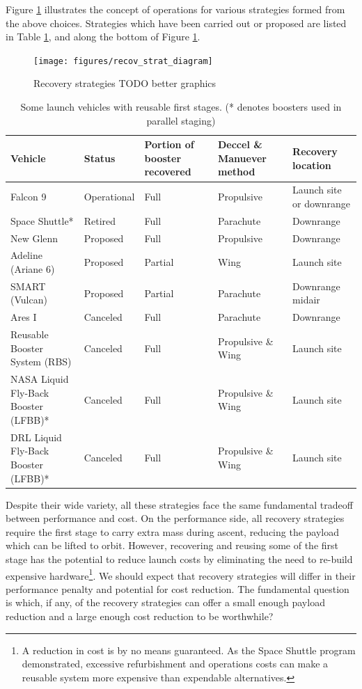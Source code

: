 \documentclass[conf]{new-aiaa}
\begin{document}
Figure \ref{fig:recov_strat_diagram} illustrates the concept of operations for various strategies formed from the above choices. Strategies which have been carried out or proposed are listed in Table \ref{tab:vehicles}, and along the bottom of Figure \ref{fig:recov_strat_diagram}.

\begin{figure}[hbt!]
	\centering
	\texttt{[image: figures/recov\_strat\_diagram]}
	\label{fig:recov_strat_diagram}
	\caption{Recovery strategies TODO better graphics}
\end{figure}

\begin{table}
	\caption{\label{tab:vehicles} Some launch vehicles with reusable first stages. (* denotes boosters used in parallel staging)}
	\centering
	\begin{tabular}{p{4cm} l p{2cm}  p{2cm} p{2cm}}
		\hline
		Vehicle & Status & Portion of booster recovered & Deccel \& Manuever method & Recovery location \\
		\hline
		\hline
		Falcon 9 & Operational & Full & Propulsive & Launch site or downrange \\
		\hline
		Space Shuttle* & Retired & Full & Parachute & Downrange \\
		\hline
		New Glenn & Proposed & Full & Propulsive & Downrange \\
		Adeline (Ariane 6) & Proposed & Partial & Wing & Launch site \\
		SMART (Vulcan) \cite{Ragab2015} & Proposed & Partial & Parachute & Downrange midair \\
		\hline
		Ares I \cite{Ares2009} & Canceled & Full & Parachute & Downrange \\
		Reusable Booster System (RBS) \cite{NAP13534} & Canceled & Full & Propulsive \& Wing & Launch site\\
		NASA Liquid Fly-Back Booster (LFBB)* \cite{Healy1998} & Canceled & Full & Propulsive \& Wing & Launch site\\
		DRL Liquid Fly-Back Booster (LFBB)* \cite{Sippel2003} & Canceled & Full & Propulsive \& Wing & Launch site\\
		\hline
	\end{tabular}
\end{table}

Despite their wide variety, all these strategies face the same fundamental tradeoff between performance and cost. On the performance side, all recovery strategies require the first stage to carry extra mass during ascent, reducing the payload which can be lifted to orbit. However, recovering and reusing some of the first stage has the potential to reduce launch costs by eliminating the need to re-build expensive hardware\footnote{A reduction in cost is by no means guaranteed. As the Space Shuttle program demonstrated, excessive refurbishment and operations costs can make a reusable system more expensive than expendable alternatives.}. We should expect that recovery strategies will differ in their performance penalty and potential for cost reduction. The fundamental question is which, if any, of the recovery strategies can offer a small enough payload reduction and a large enough cost reduction to be worthwhile?
\end{document}
